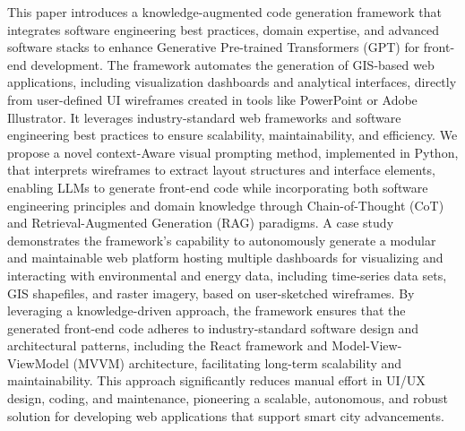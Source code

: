 This paper introduces a knowledge-augmented code generation framework that integrates software engineering best practices, domain expertise, and advanced software stacks to enhance Generative Pre-trained Transformers (GPT) for front-end development. The framework automates the generation of GIS-based web applications, including visualization dashboards and analytical interfaces, directly from user-defined UI wireframes created in tools like PowerPoint or Adobe Illustrator. It leverages industry-standard web frameworks and software engineering best practices to ensure scalability, maintainability, and efficiency. We propose a novel context-Aware visual prompting method, implemented in Python, that interprets wireframes to extract layout structures and interface elements, enabling LLMs to generate front-end code while incorporating both software engineering principles and domain knowledge through Chain-of-Thought (CoT) and Retrieval-Augmented Generation (RAG) paradigms. A case study demonstrates the framework’s capability to autonomously generate a modular and maintainable web platform hosting multiple dashboards for visualizing and interacting with environmental and energy data, including time-series data sets, GIS shapefiles, and raster imagery, based on user-sketched wireframes. By leveraging a knowledge-driven approach, the framework ensures that the generated front-end code adheres to industry-standard software design and architectural patterns, including the React framework and Model-View-ViewModel (MVVM) architecture, facilitating long-term scalability and maintainability. This approach significantly reduces manual effort in UI/UX design, coding, and maintenance, pioneering a scalable, autonomous, and robust solution for developing web applications that support smart city advancements.



 





